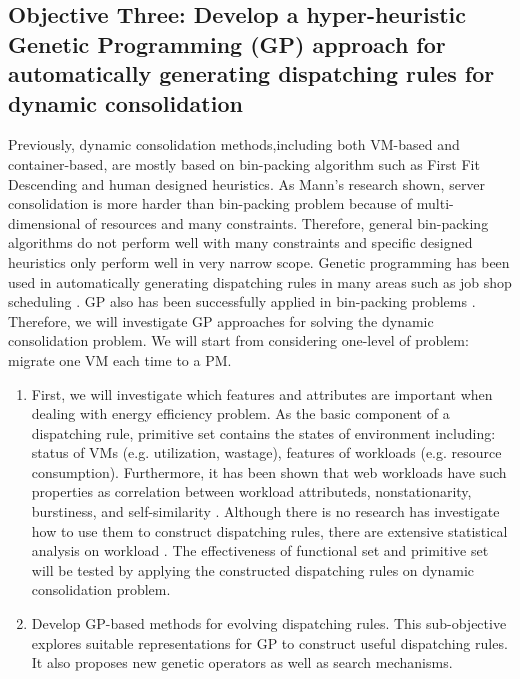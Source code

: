 \subsection{Objective Three: Develop a hyper-heuristic Genetic Programming (GP) approach for automatically generating dispatching rules for dynamic consolidation}

Previously, dynamic consolidation methods,including both VM-based and container-based, are mostly based on bin-packing algorithm such as First Fit Descending and human designed heuristics. As Mann's research \cite{Mann:2015ua} shown, server consolidation is more harder than bin-packing problem because of multi-dimensional of resources and many constraints. Therefore, general bin-packing algorithms do not perform well with many constraints and specific designed heuristics only perform well in very narrow scope. Genetic programming has been used in automatically generating dispatching rules in many areas such as job shop scheduling \cite{Nguyen:2014eu}. GP also has been successfully applied in bin-packing problems \cite{Burke:2006ei}. Therefore, we will investigate GP approaches for solving the dynamic consolidation problem. We will start from considering one-level of problem: migrate one VM each time to a PM. 


\begin{enumerate}
	\item First, we will investigate which features and attributes are important when dealing with energy efficiency problem. As the basic component of a dispatching rule, primitive set contains the states of environment including: status of VMs (e.g. utilization, wastage), features of workloads (e.g. resource consumption). Furthermore, it has been shown that web workloads have such properties as correlation between workload attributeds, nonstationarity, burstiness, and self-similarity 
	\cite{Feitelson:2002kn}. Although there is no research has investigate how to use them to construct dispatching rules, there are extensive statistical analysis on workload \cite{Verma:2009wi}. The effectiveness of functional set and primitive set will be tested by applying the constructed dispatching rules on dynamic consolidation problem.

	\item Develop GP-based methods for evolving dispatching rules. This sub-objective explores suitable representations for GP to construct useful dispatching rules. It also proposes new genetic operators as well as search mechanisms. 
	\end{enumerate}

